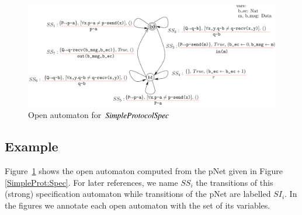 \documentclass{elsarticle}
\newcommand{\TODO}[1]{\textcolor{red}{\textbf{[TODO:#1]}}}
\begin{document}







\begin{figure}[ht]
   \centerline{\includegraphics[width=\linewidth]{XFIG/SPSpecOpen}}
   \caption{Open automaton for  $\symb{SimpleProtocolSpec}$}
   \label{SimpleProtCounter:SpecOA}
\end{figure}


\subsection*{Example}  Figure~\ref{SimpleProtCounter:SpecOA} shows the open automaton computed from the  pNet  given in Figure \ref{SimpleProt:Spec}. 
For later references, we name $SS_i$ the transitions of this (strong)
specification automaton while transitions of the
  pNet are labelled $SI_i$.
 In the figures we
annotate each open automaton with the set of its variables.
\end{document}
